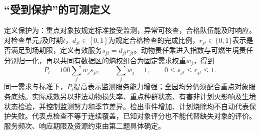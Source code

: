 \documentclass[UTF8,fontset=fandol,12pt,a4paper]{ctexart}
\begin{document}
\subsection{“受到保护”的可测定义}

定义保护为：重点对象按规定标准接受监测，异常可核查，合格队伍能及时响应。对检查单元$j$及时期$t$，$d_{jt}\in[0,1]$为规定合格检查的完成比例，$r_{jt}\in\{0,1\}$表示是否满足到场期限，定义有效服务$s_{jt}=d_{jt}r_{jt}$。动物责任乘进入指数与可燃生境责任分别归一化，再以共同有数据区的熵权组合为固定需求权重$w_j$，得到
\begin{equation}
P_t=100\sum_j w_js_{jt},
\qquad \sum_j w_j=1,
\qquad 0\le s_{jt}\le r_{jt}\le1.
\label{eq:q1_protection}
\end{equation}
同一需求与标准下，$P_t$提高表示监测服务能力增强；全园均分仍须配合重点对象服务底线。实际成效另以非法动物损失率、重点种群状态、有害非计划火影响及生境状态检验，并控制监测努力和季节差异。检出事件增加、计划烧除均不自动代表保护失败。代表点检查不等于连续覆盖，已知对象评分也不能代替缺失对象的评价。服务频次、响应期限及资源约束由第二题具体确定。
\end{document}
